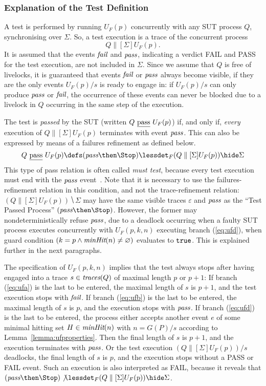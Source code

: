 \subsubsection*{Explanation of the Test Definition}
A test is performed by running $U_F(p)$ concurrently with any SUT process
$Q$, synchronising over $\Sigma$. So, a test execution is a trace of
the concurrent process
\[
Q\parallel[\Sigma] U_F(p).
\]
It is assumed that the events ${\text{\it fail}}$ and ${\text{\it pass}}$, indicating a verdict
FAIL and PASS for the test execution, are not included in $\Sigma$. Since we
assume that $Q$ is free of livelocks, it is guaranteed that events 
${\text{\it fail}}$ or ${\text{\it pass}}$ always become visible, if they are the only events
$U_F(p)/s$ is ready to engage in: if $U_F(p)/s$ can only produce ${\text{\it pass}}$ or
${\text{\it fail}}$, the occurrence of these events can never be blocked due to a livelock in $Q$
occurring in the same step of the execution.


The test is
\emph{passed} by the SUT (written $Q\ \underline{\text{pass}}\ U_F(p)$) if, and only if, {\it
every} execution of $Q\parallel[\Sigma] U_F(p)$ terminates with   event
${\text{\it pass}}$. This can also be  expressed by means of a failures refinement as
defined below.
%
\begin{equation}
\label{eq:passF}
Q\ \pass\ U_F(p) \defs (\epass\then\Stop) \lessdet_F (Q\parallel[\Sigma] U_F(p)) \hide \Sigma
\end{equation}
%
This type of pass relation is often called \emph{must test}, because every
test execution must end with the ${\text{\it pass}}$
event~\cite{Hennessy:1988:ATP:50497}. Note that it is necessary to use the
failures-refinement relation in this condition, and not the trace-refinement
relation:~$(Q\parallel[\Sigma] U_F(p)) \hide \Sigma$ may have  the same
visible traces $\varepsilon$ and ${\text{\it pass}}$ as the ``Test Passed
Process'' $(\epass\then\Stop)$. However, the former may nondeterministically
refuse ${\text{\it pass}}$, due to a deadlock occurring when a faulty SUT process
executes concurrently with $U_F(p,k,n)$ executing branch (\ref{eq:ufd}),
when guard condition $(k = p\wedge \text{\it minHit}(n)\neq\varnothing)$ evaluates to $\mbox{{\tt true}}$. 
This is explained further in the next paragraphs.

The specification of $U_F(p,k,n)$ implies that the test always stops after having engaged into a trace $s\in\text{\it traces}(Q)$ of maximal length $p$ or $p+1$: 
If branch (\ref{eq:ufa})
is the last to be entered, the maximal length of $s$ is $p+1$, and the test execution
stops with ${\text{\it fail}}$. If branch (\ref{eq:ufb}) is the last to be entered, the maximal length of $s$ is $p$, and the execution stops with ${\text{\it pass}}$. If branch (\ref{eq:ufd})
is the last to be entered, the process either accepts another event
$e$ of some minimal hitting set $H\in\text{\it minHit}(n)$ with $n = G(P)/s$ according to
Lemma~\ref{lemma:ufproperties}. Then the final length
of $s$ is $p+1$, and the execution terminates with ${\text{\it pass}}$. Or the test execution
$(Q\parallel[\Sigma] U_F(p))/s$ deadlocks,  the final length of $s$ is $p$,
and the execution stops without a PASS or FAIL event. Such an execution is also interpreted as FAIL, because it reveals that $(\epass\then\Stop) \not\lessdet_F (Q\parallel[\Sigma] U_F(p)) \hide \Sigma$.


